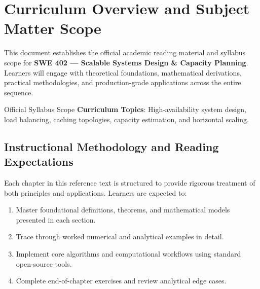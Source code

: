 \section{Curriculum Overview and Subject Matter Scope}

This document establishes the official academic reading material and syllabus scope for \textbf{SWE 402 --- Scalable Systems Design \& Capacity Planning}. Learners will engage with theoretical foundations, mathematical derivations, practical methodologies, and production-grade applications across the entire sequence.

\begin{InsightBox}{Official Syllabus Scope}
  \textbf{Curriculum Topics}: High-availability system design, load balancing, caching topologies, capacity estimation, and horizontal scaling.
\end{InsightBox}

\subsection{Instructional Methodology and Reading Expectations}

Each chapter in this reference text is structured to provide rigorous treatment of both principles and applications. Learners are expected to:
\begin{enumerate}
  \item Master foundational definitions, theorems, and mathematical models presented in each section.
  \item Trace through worked numerical and analytical examples in detail.
  \item Implement core algorithms and computational workflows using standard open-source tools.
  \item Complete end-of-chapter exercises and review analytical edge cases.
\end{enumerate}

